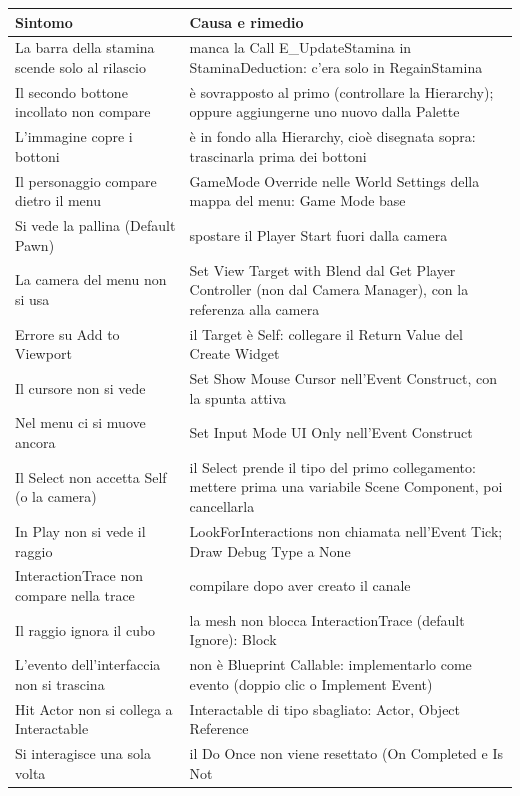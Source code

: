 \begin{table}[htbp]
\centering
\small
\begin{tabular}{@{}p{5.4cm}p{8.6cm}@{}}
\toprule
\textbf{Sintomo} & \textbf{Causa e rimedio} \\
\midrule
La barra della stamina scende solo al rilascio & manca la Call E\_UpdateStamina in
StaminaDeduction: c'era solo in RegainStamina \\
Il secondo bottone incollato non compare & è sovrapposto al primo (controllare la
Hierarchy); oppure aggiungerne uno nuovo dalla Palette \\
L'immagine copre i bottoni & è in fondo alla Hierarchy, cioè disegnata sopra: trascinarla
prima dei bottoni \\
Il personaggio compare dietro il menu & GameMode Override nelle World Settings della
mappa del menu: Game Mode base \\
Si vede la pallina (Default Pawn) & spostare il Player Start fuori dalla camera \\
La camera del menu non si usa & Set View Target with Blend dal Get Player Controller (non
dal Camera Manager), con la referenza alla camera \\
Errore su Add to Viewport & il Target è Self: collegare il Return Value del Create Widget \\
Il cursore non si vede & Set Show Mouse Cursor nell'Event Construct, con la spunta attiva \\
Nel menu ci si muove ancora & Set Input Mode UI Only nell'Event Construct \\
Il Select non accetta Self (o la camera) & il Select prende il tipo del primo collegamento:
mettere prima una variabile Scene Component, poi cancellarla \\
In Play non si vede il raggio & LookForInteractions non chiamata nell'Event Tick; Draw
Debug Type a None \\
InteractionTrace non compare nella trace & compilare dopo aver creato il canale \\
Il raggio ignora il cubo & la mesh non blocca InteractionTrace (default Ignore): Block \\
L'evento dell'interfaccia non si trascina & non è Blueprint Callable: implementarlo come
evento (doppio clic o Implement Event) \\
Hit Actor non si collega a Interactable & Interactable di tipo sbagliato: Actor, Object
Reference \\
Si interagisce una sola volta & il Do Once non viene resettato (On Completed e Is Not

\end{tabular}
\end{table}
